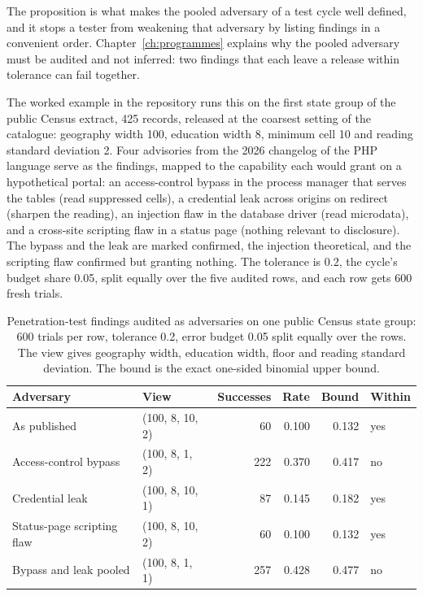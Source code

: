 The proposition is what makes the pooled adversary of a test cycle well defined, and it
stops a tester from weakening that adversary by listing findings in a convenient
order. Chapter~\ref{ch:programmes} explains why the pooled adversary must be audited
and not inferred: two findings that each leave a release within tolerance can fail
together.

The worked example in the repository runs this on the first state group of the public
Census extract, 425 records, released at the coarsest setting of the catalogue:
geography width 100, education width 8, minimum cell 10 and reading standard deviation
2. Four advisories from the 2026 changelog of the PHP language serve as the findings, mapped to the capability each would grant on a hypothetical portal: an
access-control bypass in the process manager that serves the tables (read suppressed
cells), a credential leak across origins on redirect (sharpen the reading), an
injection flaw in the database driver (read microdata), and a cross-site scripting
flaw in a status page (nothing relevant to disclosure). The bypass and the leak are
marked confirmed, the injection theoretical, and the scripting flaw confirmed but
granting nothing. The tolerance is 0.2, the cycle's budget share 0.05, split equally
over the five audited rows, and each row gets 600 fresh trials.

\begin{table}[ht]
\centering
\caption{Penetration-test findings audited as adversaries on one public Census state
group: 600 trials per row, tolerance 0.2, error budget 0.05 split equally over the rows.
The view gives geography width, education width, floor and reading standard deviation.
The bound is the exact one-sided binomial upper bound.}
\label{c14:tab-pentest}
\small
\begin{tabular}{llrrrl}
\toprule
Adversary & View & Successes & Rate & Bound & Within \\
\midrule
As published                        & (100, 8, 10, 2) & 60  & 0.100 & 0.132 & yes \\
Access-control bypass               & (100, 8, 1, 2)  & 222 & 0.370 & 0.417 & no \\
Credential leak                     & (100, 8, 10, 1) & 87  & 0.145 & 0.182 & yes \\
Status-page scripting flaw          & (100, 8, 10, 2) & 60  & 0.100 & 0.132 & yes \\
Bypass and leak pooled              & (100, 8, 1, 1)  & 257 & 0.428 & 0.477 & no \\
\bottomrule
\end{tabular}
\end{table}

